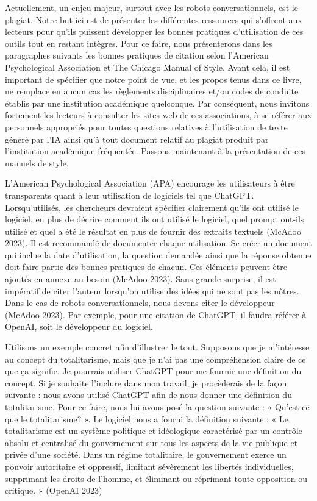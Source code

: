 \documentclass[
  letterpaper,
]{scrbook}
\begin{document}
Actuellement, un enjeu majeur, surtout avec les robots conversationnels,
est le plagiat. Notre but ici est de présenter les différentes
ressources qui s'offrent aux lecteurs pour qu'ils puissent développer
les bonnes pratiques d'utilisation de ces outils tout en restant
intègres. Pour ce faire, nous présenterons dans les paragraphes suivants
les bonnes pratiques de citation selon l'American Psychological
Association et The Chicago Manual of Style. Avant cela, il est important
de spécifier que notre point de vue, et les propos tenus dans ce livre,
ne remplace en aucun cas les règlements disciplinaires et/ou codes de
conduite établis par une institution académique quelconque. Par
conséquent, nous invitons fortement les lecteurs à consulter les sites
web de ces associations, à se référer aux personnels appropriés pour
toutes questions relatives à l'utilisation de texte généré par l'IA
ainsi qu'à tout document relatif au plagiat produit par l'institution
académique fréquentée. Passons maintenant à la présentation de ces
manuels de style.

L'American Psychological Association (APA) encourage les utilisateurs à
être transparents quant à leur utilisation de logiciels tel que ChatGPT.
Lorsqu'utilisés, les chercheurs devraient spécifier clairement qu'ils
ont utilisé le logiciel, en plus de décrire comment ils ont utilisé le
logiciel, quel prompt ont-ils utilisé et quel a été le résultat en plus
de fournir des extraits textuels (McAdoo 2023). Il est recommandé de
documenter chaque utilisation. Se créer un document qui inclue la date
d'utilisation, la question demandée ainsi que la réponse obtenue doit
faire partie des bonnes pratiques de chacun. Ces éléments peuvent être
ajoutés en annexe au besoin (McAdoo 2023). Sans grande surprise, il est
impératif de citer l'auteur lorsqu'on utilise des idées qui ne sont pas
les nôtres. Dans le cas de robots conversationnels, nous devons citer le
développeur (McAdoo 2023). Par exemple, pour une citation de ChatGPT, il
faudra référer à OpenAI, soit le développeur du logiciel.

Utilisons un exemple concret afin d'illustrer le tout. Supposons que je
m'intéresse au concept du totalitarisme, mais que je n'ai pas une
compréhension claire de ce que ça signifie. Je pourrais utiliser ChatGPT
pour me fournir une définition du concept. Si je souhaite l'inclure dans
mon travail, je procèderais de la façon suivante : nous avons utilisé
ChatGPT afin de nous donner une définition du totalitarisme. Pour ce
faire, nous lui avons posé la question suivante : « Qu'est-ce que le
totalitarisme? ». Le logiciel nous a fourni la définition suivante : «
Le totalitarisme est un système politique et idéologique caractérisé par
un contrôle absolu et centralisé du gouvernement sur tous les aspects de
la vie publique et privée d'une société. Dans un régime totalitaire, le
gouvernement exerce un pouvoir autoritaire et oppressif, limitant
sévèrement les libertés individuelles, supprimant les droits de l'homme,
et éliminant ou réprimant toute opposition ou critique. » (OpenAI 2023)
\end{document}
